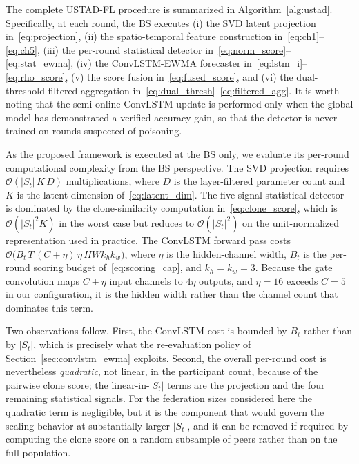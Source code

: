 \documentclass[journal]{IEEEtran}
\begin{document}
The complete USTAD-FL procedure is summarized in Algorithm~\ref{alg:ustad}. Specifically, at each round, the BS executes (i) the SVD latent projection in~\eqref{eq:projection}, (ii) the spatio-temporal feature construction in~\eqref{eq:ch1}--\eqref{eq:ch5}, (iii) the per-round statistical detector in~\eqref{eq:norm_score}--\eqref{eq:stat_ewma}, (iv) the ConvLSTM-EWMA forecaster in~\eqref{eq:lstm_i}--\eqref{eq:rho_score}, (v) the score fusion in~\eqref{eq:fused_score}, and (vi) the dual-threshold filtered aggregation in~\eqref{eq:dual_thresh}--\eqref{eq:filtered_agg}. It is worth noting that the semi-online ConvLSTM update is performed only when the global model has demonstrated a verified accuracy gain, so that the detector is never trained on rounds suspected of poisoning.

As the proposed framework is executed at the BS only, we evaluate its per-round computational complexity from the BS perspective. The SVD projection requires $\mathcal{O}(|S_t|\,K\,D)$ multiplications, where $D$ is the layer-filtered parameter count and $K$ is the latent dimension of~\eqref{eq:latent_dim}. The five-signal statistical detector is dominated by the clone-similarity computation in~\eqref{eq:clone_score}, which is $\mathcal{O}(|S_t|^2 K)$ in the worst case but reduces to $\mathcal{O}(|S_t|^2)$ on the unit-normalized representation used in practice. The ConvLSTM forward pass costs $\mathcal{O}\bigl(B_t\,T\,(C + \eta)\,\eta\, H W k_h k_w\bigr)$, where $\eta$ is the hidden-channel width, $B_t$ is the per-round scoring budget of~\eqref{eq:scoring_cap}, and $k_h\!=\!k_w\!=\!3$. Because the gate convolution maps $C + \eta$ input channels to $4\eta$ outputs, and $\eta = 16$ exceeds $C = 5$ in our configuration, it is the hidden width rather than the channel count that dominates this term.

Two observations follow. First, the ConvLSTM cost is bounded by $B_t$ rather than by $|S_t|$, which is precisely what the re-evaluation policy of Section~\ref{sec:convlstm_ewma} exploits. Second, the overall per-round cost is nevertheless \emph{quadratic}, not linear, in the participant count, because of the pairwise clone score; the linear-in-$|S_t|$ terms are the projection and the four remaining statistical signals. For the federation sizes considered here the quadratic term is negligible, but it is the component that would govern the scaling behavior at substantially larger $|S_t|$, and it can be removed if required by computing the clone score on a random subsample of peers rather than on the full population.
\end{document}
